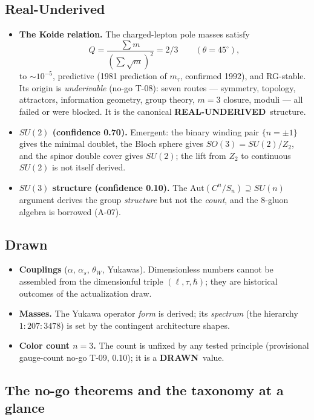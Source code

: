 \documentclass[10pt,a4paper]{article}
\newcommand{\realunder}{\textbf{REAL-UNDERIVED}}
\newcommand{\drawn}{\textbf{DRAWN}}
\begin{document}
\subsection{Real-Underived}

\begin{itemize}
\item \textbf{The Koide relation.} The charged-lepton pole masses satisfy
\begin{equation}
Q=\frac{\sum m}{(\sum\sqrt m)^2}=2/3\qquad(\theta=45^\circ),
\end{equation}
to $\sim10^{-5}$, predictive (1981 prediction of $m_\tau$, confirmed 1992), and RG-stable.
Its origin is \emph{underivable} (no-go T-08): seven routes --- symmetry, topology,
attractors, information geometry, group theory, $m=3$ closure, moduli --- all failed or
were blocked. It is the canonical \realunder\ structure.
\item \textbf{$SU(2)$ (confidence 0.70).} Emergent: the binary winding pair $\{n=\pm1\}$
gives the minimal doublet, the Bloch sphere gives $SO(3)=SU(2)/Z_2$, and the spinor double
cover gives $SU(2)$; the lift from $Z_2$ to continuous $SU(2)$ is not itself derived.
\item \textbf{$SU(3)$ structure (confidence 0.10).} The
$\mathrm{Aut}(C^n/S_n)\supseteq SU(n)$ argument derives the group \emph{structure} but not
the \emph{count}, and the 8-gluon algebra is borrowed (A-07).
\end{itemize}

\subsection{Drawn}

\begin{itemize}
\item \textbf{Couplings} ($\alpha$, $\alpha_s$, $\theta_W$, Yukawas). Dimensionless numbers
cannot be assembled from the dimensionful triple $(\ell,\tau,\hbar)$; they are historical
outcomes of the actualization draw.
\item \textbf{Masses.} The Yukawa operator \emph{form} is derived; its \emph{spectrum} (the
hierarchy $1{:}207{:}3478$) is set by the contingent architecture shapes.
\item \textbf{Color count $n=3$.} The count is unfixed by any tested principle (provisional
gauge-count no-go T-09, 0.10); it is a \drawn\ value.
\end{itemize}

\subsection{The no-go theorems and the taxonomy at a glance}
\end{document}
